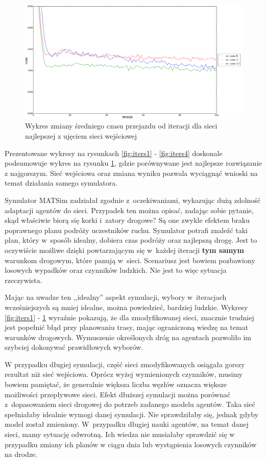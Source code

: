 \documentclass[twoside,12pt]{report}
\begin{document}
\begin{figure}[htbp]
\centering
\includegraphics[width=1\textwidth]{img/iters/iters5}
\caption{Wykres zmiany średniego czasu przejazdu od iteracji dla sieci najlepszej z ujęciem sieci wejściowej}
\label{fig:iters5}
\end{figure}

Prezentowane wykresy na rysunkach \ref{fig:iters1} - \ref{fig:iters4} doskonale podsumowuje wykres na rysunku \ref{fig:iters5}, gdzie porównywane jest najlepsze rozwiązanie z najgorszym. Sieć wejściowa oraz zmiana wyniku pozwala wyciągnąć wnioski na temat działania samego symulatora.

Symulator MATSim zadziałał zgodnie z~oczekiwaniami, wykazując dużą zdolność adaptacji agentów do sieci. Przypadek ten można opisać, zadając sobie pytanie, skąd właściwie biorą się korki i~zatory drogowe? Są one zwykle efektem braku poprawnego planu podróży uczestników ruchu. Symulator potrafi znaleźć taki plan, który w~sposób idealny, dobiera czas podróży oraz najlepszą drogę. Jest to oczywiście możliwe dzięki powtarzającym się w~każdej iteracji \textbf{tym samym} warunkom drogowym, które panują w~sieci. Scenariusz jest bowiem pozbawiony losowych wypadków oraz czynników ludzkich. Nie jest to więc sytuacja rzeczywista.

Mając na uwadze ten ,,idealny'' aspekt symulacji, wybory w~iteracjach wcześniejszych są mniej idealne, można powiedzieć, bardziej ludzkie. Wykresy \ref{fig:iters1} - \ref{fig:iters5} wyraźnie pokazują, że dla zmodyfikowanej sieci, znacznie trudniej jest popełnić błąd przy planowaniu trasy, mając ograniczoną wiedzę na temat warunków drogowych. Wymuszenie określonych dróg na agentach pozwoliło im szybciej dokonywać prawidłowych wyborów.

W przypadku długiej symulacji, część sieci zmodyfikowanych osiągała gorszy rezultat niż sieć wejściowa. Oprócz wyżej wymienionych czynników, musimy bowiem pamiętać, że generalnie większa liczba węzłów oznacza większe możliwości przepływowe sieci. Efekt dłuższej symulacji można porównać z~dopasowaniem sieci drogowej do potrzeb zadanego modelu agentów. Taka sieć spełniałaby idealnie wymogi danej symulacji. Nie sprawdziłaby się, jednak gdyby model został zmieniony. W~przypadku długiej nauki agentów, na temat danej sieci, mamy sytuację odwrotną. Ich wiedza nie musiałaby sprawdzić się w przypadku zmiany ich planów w ciągu dnia lub wystąpienia losowych czynników na drodze.
\end{document}
